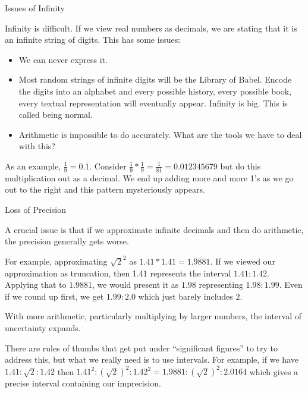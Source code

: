 \documentclass{beamer}
\begin{document}
\begin{frame}{Issues of Infinity}

    Infinity is difficult. If we view real numbers as decimals, we are stating that it is an infinite string of digits. This has some issues: 

    \begin{itemize}
        \item We can never express it. 
        \item Most random strings of infinite digits will be the Library of Babel. Encode the digits into an alphabet and every possible history, every possible book, every textual representation will eventually appear. Infinity is big. This is called being normal. 
        \item Arithmetic is impossible to do accurately. What are the tools we have to deal with this? 
    \end{itemize}

    As an example, $\frac{1}{9} = 0.\bar{1}$. Consider $\frac{1}{9}*\frac{1}{9} = \frac{1}{81} = 0.\overline{012345679}$ but do this multiplication out as a decimal. We end up adding more and more 1's as we go out to the right and this pattern mysteriously appears. 
    
\end{frame}

\begin{frame}{Loss of Precision}

    A crucial issue is that if we approximate infinite decimals and then do arithmetic, the precision generally gets worse. 

    For example, approximating $\sqrt{2}^2$ as $1.41*1.41 = 1.9881$. If we viewed our approximation as truncation, then 1.41 represents the interval $1.41:1.42$.  Applying that to $1.9881$, we would present it as $1.98$ representing $1.98:1.99$. Even if we round up first, we get $1.99:2.0$ which just barely includes $2$.

    With more arithmetic, particularly multiplying by larger numbers, the interval of uncertainty expands. 

    There are rules of thumbs that get put under ``significant figures'' to try to address this, but what we really need is to use intervals.  For example, if we have $1.41:\sqrt{2}:1.42$ then $1.41^2 : (\sqrt{2})^2 : 1.42^2 = 1.9881 : (\sqrt{2})^2 : 2.0164$ which gives a precise interval containing our imprecision. 

    
\end{frame}
\end{document}
